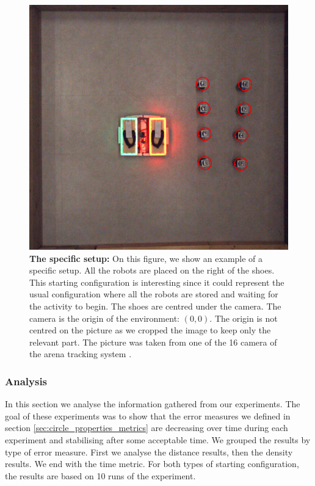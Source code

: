 \documentclass[oneside, a4paper, 12pt]{memoir}
\let\oldCaption\caption
\renewcommand{\caption}[2]{
\oldCaption[#1]{{\small\sffamily\bfseries #1:} #2}
}
\begin{document}
				\begin{figure}[!htp]
					\includegraphics[width=\textwidth]{images/setup_geo.png}
					\caption{The specific setup}{On this figure, we show an example of a specific setup. All the robots are placed on the right of the shoes. This starting configuration is interesting since it could represent the usual configuration where all the robots are stored and waiting for the activity to begin. The shoes are centred under the camera. The camera is the origin of the environment: $(0,0)$. The origin is not centred on the picture as we cropped the image to keep only the relevant part. The picture was taken from one of the 16 camera of the arena tracking system \citep{stranieri2013iridia}.}
					\label{fig:geo_setup}
				\end{figure}
			
			\subsubsection{Analysis}
			

					
					In this section we analyse the information gathered from our experiments. The goal of these experiments was to show that the error measures we defined in section \ref{sec:circle_properties_metrics} are decreasing over time during each experiment and stabilising after some acceptable time. We grouped the results by type of error measure. First we analyse the distance results, then the density results. We end with the time metric. For both types of starting configuration, the results are based on 10 runs of the experiment.
					
\end{document}
